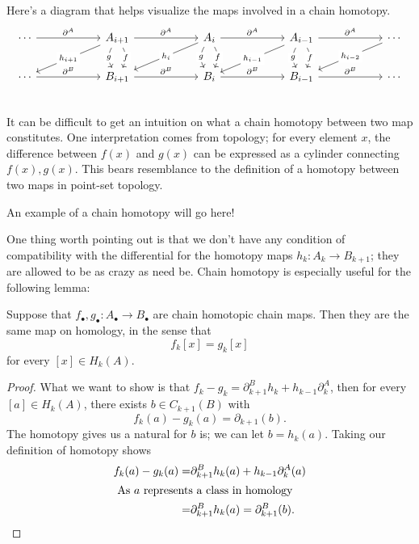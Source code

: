 Here's a diagram that helps visualize the maps involved in a chain homotopy.
\[\begin{tikzcd}[column sep=2cm]
\cdots \arrow{r}{\partial^A} & A_{i+1}\arrow[bend left]{d}[description]{f} \arrow[bend right]{d}[description]{g}\arrow{dl}[description]{h_{i+1}} \arrow{r}{\partial^A} & A_{i}\arrow[bend left]{d}[description]{f} \arrow[bend right]{d}[description]{g}\arrow{dl}[description]{h_{i}} \arrow{r}{\partial^A}& A_{i-1} \arrow[bend left]{d}[description]{f} \arrow[bend right]{d}[description]{g}\arrow{dl}[description]{h_{i-1}}\arrow{r}{\partial^A}& \cdots \arrow{dl}[description]{h_{i-2}}\\
\cdots \arrow{r}{\partial^B} & B_{i+1} \arrow{r}{\partial^B} & B_{i} \arrow{r}{\partial^B}& B_{i-1} \arrow{r}{\partial^B}& \cdots \\
\end{tikzcd}\]
It can be difficult to get an intuition on what a chain homotopy between two map constitutes. One interpretation comes from topology; for every element $x$, the difference between $f(x)$ and $g(x)$ can be expressed as a cylinder connecting $f(x), g(x)$. This bears resemblance to the definition of a homotopy between two maps in point-set topology. 

\begin{example} An example of a chain homotopy will go here!
\end{example}
One thing worth pointing out is that we don't have any condition of compatibility with the differential for the homotopy maps $h_k:A_k\to B_{k+1}$; they are allowed to be as crazy as need be. 
Chain homotopy is especially useful for the following lemma:
\begin{lemma}
Suppose that $f_\bullet, g_\bullet: A_\bullet\to B_\bullet$ are chain homotopic chain maps. Then they are the same map on homology, in the sense that 
\[f_k[x]=g_k[x]\]
for every $[x]\in H_k(A). $
\end{lemma}
\begin{proof}
What we want to show is that $f_k-g_k= \partial^B_{k+1} h_{k}+h_{k-1}\partial^A_k$, then for every $[a]\in H_k(A)$, there exists $b\in C_{k+1}(B)$ with 
\[f_k(a)-g_k(a)=\partial_{k+1}(b).\]
The homotopy gives us a natural for $b$ is; we can let $b=h_k(a)$. Taking our definition of homotopy shows 
\begin{align*}f_k(a)-g_k(a)=&\partial^B_{k+1} h_{k}(a)+h_{k-1}\partial^A_k(a)\\
\intertext{ As $a$ represents a class in homology} 
=& \partial^B_{k+1} h_{k}(a)= \partial^B_{k+1}(b). \end{align*}
\end{proof}


